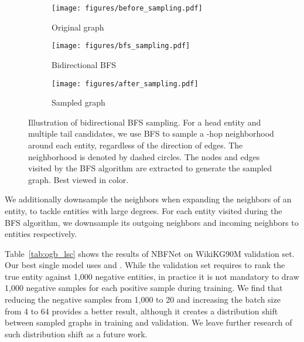 \begin{figure}[!t]
    \centering
    \begin{subfigure}{0.32\textwidth}
        \centering
        \texttt{[image: figures/before\_sampling.pdf]}
        \caption{Original graph}
    \end{subfigure}
    \begin{subfigure}{0.32\textwidth}
        \centering
        \texttt{[image: figures/bfs\_sampling.pdf]}
        \caption{Bidirectional BFS}
    \end{subfigure}
    \begin{subfigure}{0.32\textwidth}
        \centering
        \texttt{[image: figures/after\_sampling.pdf]}
        \caption{Sampled graph}
    \end{subfigure}
    \caption{Illustration of bidirectional BFS sampling. For a \textcolor{myblue}{head entity} and multiple \textcolor{myorange}{tail candidates}, we use BFS to sample a -hop neighborhood around each entity, regardless of the direction of edges. The neighborhood is denoted by dashed circles. The nodes and edges visited by the BFS algorithm are extracted to generate the sampled graph. Best viewed in color.}
    \label{fig:bfs_sampling}
\end{figure}

We additionally downsample the neighbors when expanding the neighbors of an entity, to tackle entities with large degrees. For each entity visited during the BFS algorithm, we downsample its outgoing neighbors and incoming neighbors to  entities respectively.

Table~\ref{tab:ogb_lsc} shows the results of NBFNet on WikiKG90M validation set. Our best single model uses  and . While the validation set requires to rank the true entity against 1,000 negative entities, in practice it is not mandatory to draw 1,000 negative samples for each positive sample during training. We find that reducing the negative samples from 1,000 to 20 and increasing the batch size from 4 to 64 provides a better result, although it creates a distribution shift between sampled graphs in training and validation. We leave further research of such distribution shift as a future work.



